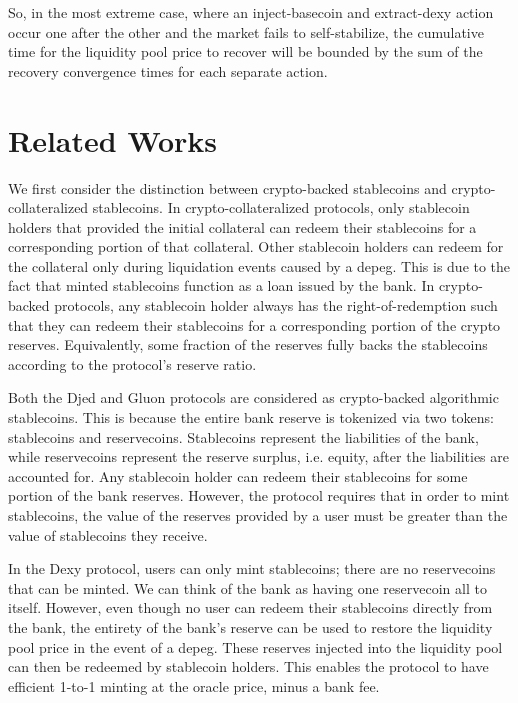 \documentclass{ifcolog}
\begin{document}
So, in the most extreme case, where an inject-basecoin and extract-dexy action occur one after the other and the market fails 
to self-stabilize, the cumulative time for the liquidity pool price to recover will be bounded by the sum of the 
recovery convergence times for each separate action.

\section{Related Works}
\label{sec:related-works}
We first consider the distinction between crypto-backed stablecoins and crypto-collateralized stablecoins.
In crypto-collateralized protocols, only stablecoin holders that provided the initial collateral can redeem their stablecoins for 
a corresponding portion of that collateral. Other stablecoin holders can redeem for the collateral only during 
liquidation events caused by a depeg. This is due to the fact that minted stablecoins function as a loan issued by the bank. 
In crypto-backed protocols, any stablecoin holder always has the right-of-redemption such that they can redeem
their stablecoins for a corresponding portion of the crypto reserves. Equivalently, some fraction of the reserves 
fully backs the stablecoins according to the protocol's reserve ratio.

Both the Djed \cite{DjedEprint} and Gluon \cite{Gluon} protocols are considered as crypto-backed algorithmic stablecoins.
This is because the entire bank reserve is tokenized via two tokens: stablecoins and reservecoins.
Stablecoins represent the liabilities of the bank, while reservecoins represent the reserve surplus, 
i.e. equity, after the liabilities are accounted for. Any stablecoin holder can redeem their stablecoins for some 
portion of the bank reserves. However, the protocol requires that in order to mint stablecoins, 
the value of the reserves provided by a user must be 
greater than the value of stablecoins they receive.

In the Dexy protocol, users can only mint stablecoins; there are no reservecoins that can be minted. 
We can think of the bank as having one reservecoin all to itself. However, even though no user can redeem their 
stablecoins directly from the bank, the entirety of the bank's reserve can be used to restore the liquidity 
pool price in the event of a depeg. These reserves injected into the liquidity pool can then be redeemed by stablecoin holders.
This enables the protocol to have efficient 1-to-1 minting at the oracle price, minus a bank fee. 
\end{document}
